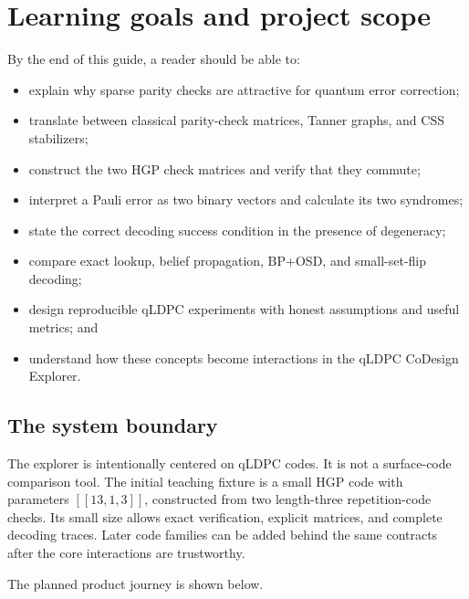 \documentclass[11pt,letterpaper]{article}
\newcommand{\code}[1]{\texttt{#1}}
\begin{document}
\tableofcontents
\clearpage

\section{Learning goals and project scope}

By the end of this guide, a reader should be able to:

\begin{itemize}
  \item explain why sparse parity checks are attractive for quantum error correction;
  \item translate between classical parity-check matrices, Tanner graphs, and CSS stabilizers;
  \item construct the two HGP check matrices and verify that they commute;
  \item interpret a Pauli error as two binary vectors and calculate its two syndromes;
  \item state the correct decoding success condition in the presence of degeneracy;
  \item compare exact lookup, belief propagation, BP+OSD, and small-set-flip decoding;
  \item design reproducible qLDPC experiments with honest assumptions and useful metrics; and
  \item understand how these concepts become interactions in the qLDPC CoDesign Explorer.
\end{itemize}

\subsection{The system boundary}

The explorer is intentionally centered on qLDPC codes. It is not a surface-code comparison tool.
The initial teaching fixture is a small HGP code with parameters $[[13,1,3]]$, constructed from two
length-three repetition-code checks. Its small size allows exact verification, explicit matrices,
and complete decoding traces. Later code families can be added behind the same contracts after the
core interactions are trustworthy.

The planned product journey is shown below.

\begin{center}
\end{center}
\end{document}
